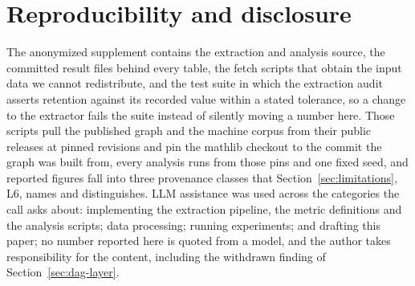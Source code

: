 
\section{Reproducibility and disclosure}
\label{sec:repro}

The anonymized supplement contains the extraction and analysis source, the
committed result files behind every table, the fetch scripts that obtain the
input data we cannot redistribute, and the test suite in which the extraction
audit asserts retention against its recorded value within a stated tolerance,
so a change to the extractor fails the suite instead of silently moving a
number here. Those scripts pull the published graph and the machine corpus from
their public releases at pinned revisions and pin the mathlib checkout to the
commit the graph was built from, every analysis runs from those pins and one
fixed seed, and reported figures fall into three provenance classes that
Section~\ref{sec:limitations}, L6, names and distinguishes. LLM assistance was
used across the categories the call asks about: implementing the extraction
pipeline, the metric definitions and the analysis scripts; data processing;
running experiments; and drafting this paper; no number reported here is quoted
from a model, and the author takes responsibility for the content, including
the withdrawn finding of Section~\ref{sec:dag-layer}.
